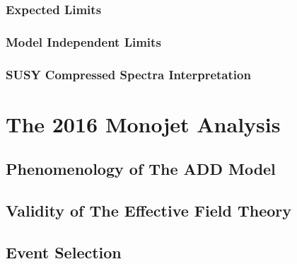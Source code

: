 \documentclass[10pt,twoside,cucitura,classica,english,openany]{toptesi}
\begin{document}


\subsection{Expected Limits}
\label{sec:expected-limits}



\subsection{Model Independent Limits}
\label{sec:model-indep-limits}



\subsection{SUSY Compressed Spectra Interpretation}
\label{sec:interpretation}



\chapter{The 2016 Monojet Analysis}
\label{cha:2016-monoj-analys}

\section{Phenomenology of The ADD Model}
\label{sec:phen-add-model}



\section{Validity of The Effective Field Theory}
\label{sec:valid-effect-field}



\section{Event Selection}
\label{sec:event-selection-1}



\end{document}

